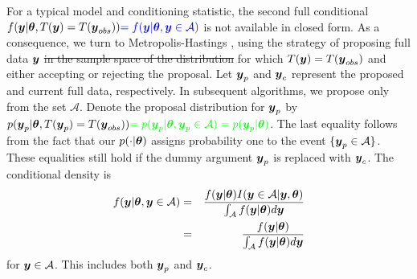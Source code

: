 \documentclass[12pt]{article}
\def\bth{\mbox{\boldmath $\theta$}}
\def\bbeta{\mbox{\boldmath $\beta$}}
\newcommand{\by}{\mbox{\boldmath $y$}}
\newcommand{\mc}{\mathcal}
\newcommand{\blue}[1]{{\color{blue}#1}}
\newcommand{\green}[1]{{\color{green}#1}}
\begin{document}
For a typical model and conditioning statistic, the second full conditional $f(\by|\bth, T(\by)=T(\by_{obs}))\blue{ =f(\by|\bth, \by\in\mc A)}$ is not available in closed form.  
As a consequence, we turn to Metropolis-Hastings \citep{hastings1970},
using the strategy of proposing full data $\by$ \green{\sout{in the sample
space of the distribution} for which $T(\by) = T(\by_{obs})$} and either accepting or rejecting the
proposal. Let $\by_p$ and  $\by_c$ represent the proposed and current
full data, respectively.  \green{In subsequent algorithms, we propose only from the set $\mathcal{A}$}. Denote the proposal distribution for $\by_{p}$ by $p(\by_p|\bth,T(\by_p) = T(\by_{obs})) \green{ = p(\by_p|\bth,\by_p \in \mathcal{A}) = p(\by_p | \bth)}$.  
\green{The last equality follows from the fact that our $p(\cdot | \bth)$ assigns probability one to the event $\{ \by_p \in \mathcal{A} \}$.  These equalities still hold if the dummy argument $\by_p$ is replaced with $\by_c$.  The conditional density is
\begin{eqnarray*}
f(\by | \bth, \by \in \mathcal{A}) & = & \frac{f(\by | \bth) I(\by \in \mathcal{A} | \by, \bth)}{\int_\mathcal{A} f(\by | \bth) d\by} \\
     & = & \frac{f(\by | \bth)}{\int_\mathcal{A} f(\by | \bth) d\by} 
\end{eqnarray*}
for $\by \in \mathcal{A}$.  This includes both $\by_p$ and $\by_c$.  
}
\end{document}

